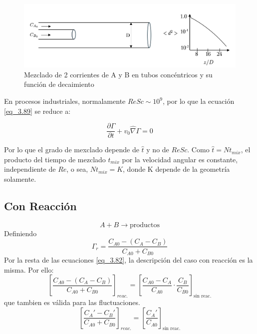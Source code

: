 \begin{figure}[h]

        \includegraphics[width=\linewidth]{Capitulo3/Imagenes/Fig_3.9.png}
        \caption{Mezclado de 2 corrientes de A y B en tubos concéntricos y su función de decaimiento}
        \label{fig:Fig_3.9}

\end{figure}

En procesos industriales, normalamente $ReSc\sim10^9$, por lo que la ecuación \eqref{eq_3.89} se reduce a:


\begin{equation}
    \frac{\partial\Gamma}{\partial t} + v_0\hat{\nabla}\Gamma = 0
\end{equation}


Por lo que el grado de mexclado depende de $\hat{t}$ y no de $ReSc$. Como $\hat{t}=Nt_{mix}$, el producto del tiempo de mezclado $t_{mix}$ por la velocidad angular es constante, independiente de $Re$, o sea, $Nt_{mix}=K$, donde K depende de la geometría solamente.

\subsection{Con Reacción}
\begin{equation*}
    A + B \rightarrow \text{productos}
\end{equation*}
Definiendo
\begin{equation}
    \Gamma_{r}=\frac{C_{A0}-(C_A-C_B)}{C_{A0}+C_{B0}}
\end{equation}
Por la resta de las ecuaciones \eqref{eq_3.82}, la descripción del caso con reacción es la misma. Por ello:
\begin{equation}
    \left[ \frac{C_{A0}-(C_A-C_B)}{C_{A0}+C_{B0}} \right]_{reac.}=   \left[ \frac{C_{A0}-C_A}{C_{A0}}\cdot\frac{C_B}{C_{B0}} \right]_{\text{sin reac.} }
\end{equation}
que tambien es válida para las fluctuaciones.
\begin{equation}
        \left[ \frac{C_A'-C_B'}{C_{A0}+C_{B0}} \right]_{reac.}=  \left[ \frac{C_A'}{C_{A0}} \right]_{\text{sin reac.} }
\end{equation}


